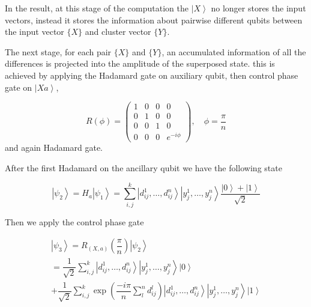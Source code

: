 \documentclass[pra,showkeys,twocolumn,showpacs]{revtex4-1}
\begin{document}
In the result, at this stage of the computation the $\left| X \right\rangle$ no longer stores the input vectors, instead it stores the information about pairwise different qubits between the input vector $\{X\}$ and cluster vector $\{Y\}$. 


The next stage, for each pair $\{X\}$ and $\{Y\}$, an accumulated information of all the differences is projected into the amplitude of the superposed state. this is achieved by applying the Hadamard gate on auxiliary qubit, then control phase gate on $\left| Xa \right\rangle$,  

\begin{equation}
    \label{eq:control_phase_rotation}
    R(\phi) = 
    \begin{pmatrix}
        1 & 0 & 0 & 0 \\
        0 & 1 & 0 & 0 \\
        0 & 0 & 1 & 0 \\
        0 & 0 & 0 & e^{-i\phi}
    \end{pmatrix},
    \quad \phi = \frac{\pi}{n}
\end{equation}
and again Hadamard gate.


After the first Hadamard on the ancillary qubit we have the following state

\begin{equation}
    \left| \psi_2 \right\rangle = H_a\left| \psi_1 \right\rangle = 
    \sum\limits_{i, j}^{k} 
    \left| d^1_{ij}, \dots, d^n_{ij} \right\rangle 
    \left| y^1_j, \dots, y^n_j \right\rangle
    \dfrac{\left| 0 \right\rangle + \left| 1 \right\rangle}{\sqrt{2}}
\end{equation}

Then we apply the control phase gate

\begin{multline}
    \left| \psi_3 \right\rangle = R_{(X,a)}\left(\dfrac{\pi}{n}\right)\left| \psi_2 \right\rangle
    \\ = \dfrac{1}{\sqrt{2}}
				\sum\limits_{i, j}^{k} 
				\left| d^1_{ij}, \dots, d^n_{ij} \right\rangle 
        \left| y^1_j, \dots, y^n_j \right\rangle 
        \left| 0 \right\rangle
        \\ + \dfrac{1}{\sqrt{2}}
				\sum\limits_{i, j}^{k}
        \exp\left(\dfrac{-i \pi}{n}\sum\limits_l^n d^l_{ij} \right)
        \left| d^1_{ij}, \dots, d^n_{ij} \right\rangle 
        \left| y^1_j, \dots, y^n_j \right\rangle 
        \left| 1 \right\rangle
\end{multline}
\end{document}
